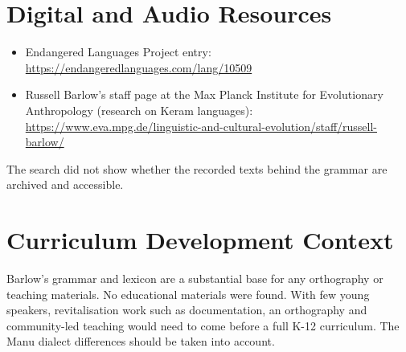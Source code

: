 \documentclass[12pt]{article}
\begin{document}
\section{Digital and Audio Resources}
\begin{itemize}
\item Endangered Languages Project entry: \url{https://endangeredlanguages.com/lang/10509}
\item Russell Barlow's staff page at the Max Planck Institute for Evolutionary Anthropology (research on Keram languages): \url{https://www.eva.mpg.de/linguistic-and-cultural-evolution/staff/russell-barlow/}
\end{itemize}
The search did not show whether the recorded texts behind the grammar are archived and accessible.

\section{Curriculum Development Context}
Barlow's grammar and lexicon are a substantial base for any orthography or teaching materials. No educational materials were found. With few young speakers, revitalisation work such as documentation, an orthography and community-led teaching would need to come before a full K-12 curriculum. The Manu dialect differences should be taken into account.
\end{document}
